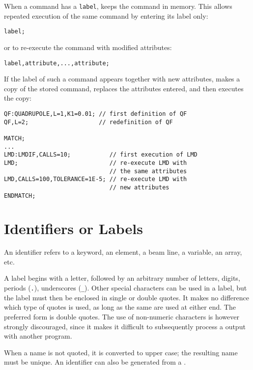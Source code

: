When a command has a \texttt{label},
\opal keeps the command in memory.
This allows repeated execution of the same command
by entering its label only:
\begin{verbatim}
label;
\end{verbatim}
or to re-execute the command with modified attributes:
\begin{verbatim}
label,attribute,...,attribute;
\end{verbatim}
If the label of such a command appears together with new attributes,
\opal makes a copy of the stored command, replaces the attributes entered,
and then executes the copy:
\begin{verbatim}
QF:QUADRUPOLE,L=1,K1=0.01; // first definition of QF
QF,L=2;                    // redefinition of QF

MATCH;
...
LMD:LMDIF,CALLS=10;           // first execution of LMD
LMD;                          // re-execute LMD with 
                              // the same attributes
LMD,CALLS=100,TOLERANCE=1E-5; // re-execute LMD with 
                              // new attributes
ENDMATCH;
\end{verbatim}

\section{Identifiers or Labels}
\label{sec:label}
An identifier refers to a keyword, an element, a beam line, a variable,
an array, etc. 

A label begins with a letter, followed by an arbitrary number of letters,
digits, periods (\texttt{.}), underscores (\texttt{\_}).
Other special characters can be used in a label,
but the label must then be enclosed in single or double quotes.
It makes no difference which type of quotes is used,
as long as the same are used at either end.
The preferred form is double quotes.
The use of non-numeric characters is however strongly discouraged,
since it makes it difficult to subsequently process a \opal output with
another program.

When a name is not quoted, it is converted to upper case;
the resulting name must be unique.
An identifier can also be generated from a
. 

